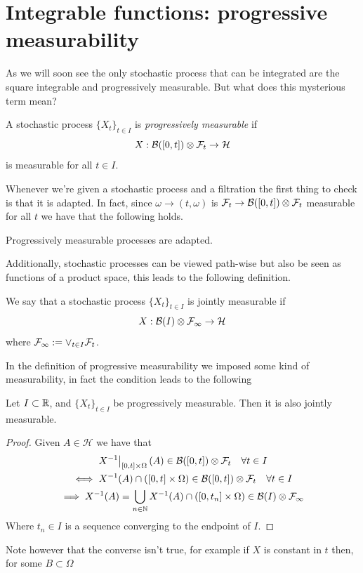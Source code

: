 \documentclass[
    a4paper,
    DIV=14,
    abstract=true,
    numbers=noenddot
]{scrartcl}
\begin{document}
\section{Integrable functions: progressive measurability}
As we will soon see the only stochastic process that can be integrated are the square integrable and progressively measurable. But what does this mysterious term mean?
\begin{definition}
	A stochastic process $\{X_t\}_{t\in I}$  is \emph{progressively measurable} if $$X:\mathcal{B}([0,t])\otimes\mathcal{F}_t\to \mathcal{H}$$ is measurable for all $t\in I$.
\end{definition}
Whenever we're given a stochastic process and a filtration the first thing to check is that it is adapted. In fact, since $\omega\to(t,\omega)$ is $\mathcal{F}_t\to \mathcal{B}([0,t])\otimes \mathcal{F}_t$ measurable for all $t$ we have that the following holds.
\begin{lemma}
	Progressively measurable processes are adapted.
\end{lemma}
Additionally, stochastic processes can be viewed path-wise but also be seen as functions of a product space, this leads to the following definition.
\begin{definition}
	We say that a stochastic process $\{X_t\}_{t\in I}$ is jointly measurable if $$X:\mathcal{B}(I)\otimes\mathcal{F}_\infty\to \mathcal{H}$$
	where $\mathcal{F}_\infty:=\vee_{t\in I}\mathcal{F}_t$.
\end{definition}
In the definition of progressive measurability we imposed some kind of measurability, in fact the condition leads to the following
\begin{proposition}
	Let $I\subset\mathbb{R}$, and $\{X_t\}_{t\in I}$ be progressively measurable. Then it is also jointly measurable.
\end{proposition}
\begin{proof}
	Given $A\in\mathcal{H}$ we have that
	\begin{multline*}
		\left.{X^{-1}}\right|_{[0,t]\times\Omega}(A)\in\mathcal{B}([0,t])\otimes\mathcal{F}_t\quad\forall t\in I\\ \iff X^{-1}(A)\cap([0,t]\times\Omega)\in\mathcal{B}([0,t])\otimes\mathcal{F}_t\quad\forall t\in I\\\implies X^{-1}(A)=\bigcup_{n \in  \mathbb{N}}X^{-1}(A)\cap([0,t_n]\times\Omega) \in\mathcal{B}(I)\otimes\mathcal{F}_\infty
	\end{multline*}
	Where $t_n\in I$ is a sequence converging to the endpoint of $I$.
\end{proof}
Note however that the converse isn't true, for example if $X$ is constant in $t$ then, for some $B\subset \Omega$
\end{document}

